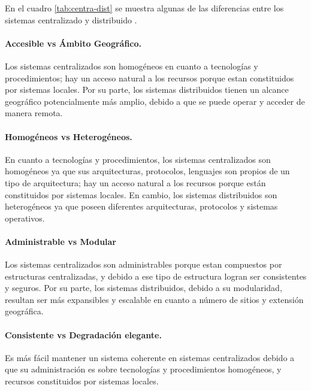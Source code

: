 En el cuadro \ref{tab:centra-dist} se muestra algunas de las diferencias entre los sistemas centralizado y distribuido .

\paragraph{Accesible vs Ámbito Geográfico.}
Los sistemas centralizados son  homogéneos  en cuanto a tecnologías y procedimientos; hay un acceso  natural a los \gls{recursos} porque estan constituidos por  sistemas locales.  
Por su parte, los sistemas distribuidos  tienen un alcance geográfico potencialmente más amplio, debido a que se puede operar y acceder de manera remota.  

\paragraph{Homogéneos vs Heterogéneos.}
En cuanto a  tecnologías y procedimientos, los sistemas centralizados son homogéneos ya que sus arquitecturas, protocolos, lenguajes son propios de un tipo de arquitectura; hay un acceso  natural a los \gls{recursos} porque están constituidos por sistemas locales. En cambio, los sistemas distribuidos son heterogéneos ya que poseen diferentes arquitecturas, protocolos y  sistemas operativos. 

\paragraph{Administrable vs Modular}
Los sistemas centralizados son administrables porque estan compuestos por estructuras centralizadas, y debido a ese tipo de estructura logran ser consistentes y seguros. Por su parte, los sistemas distribuidos,  debido a su modularidad,  resultan ser más expansibles y  escalable en cuanto a número de sitios y extensión geográfica.   

\paragraph{Consistente vs Degradación elegante.}
Es más fácil mantener un sistema coherente en  sistemas centralizados debido a que  su administración es sobre tecnologías y procedimientos homogéneos, y  recursos  constituidos por sistemas locales. 

